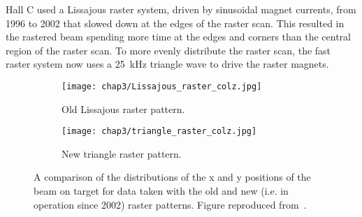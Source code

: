Hall C used a Lissajous raster system, driven by sinusoidal magnet currents,
from 1996 to 2002 that slowed down at the edges of the raster scan.
This resulted in the rastered beam spending more time at the edges and corners
than the central region of the raster scan.
To more evenly distribute the raster scan, the fast raster system now uses a
\SI{25}{\kilo\Hz} triangle wave to drive the raster magnets.

\begin{figure}[h]
    \centering
    \begin{subfigure}[b]{0.4\textwidth}
        \centering
        \texttt{[image: chap3/Lissajous\_raster\_colz.jpg]}
        \caption{Old Lissajous raster pattern.}
        \label{fig:Lissajous_raster}
    \end{subfigure}
    \hfill
    \begin{subfigure}[b]{0.4\textwidth}
        \centering
        \texttt{[image: chap3/triangle\_raster\_colz.jpg]}
        \caption{New triangle raster pattern.}
        \label{fig:triangle_raster}
    \end{subfigure}
    \caption[A comparison of the distributions of the x and y positions of the
             beam on target for data taken with the old and new raster patterns.]{A comparison of the distributions of the x and y positions of the
             beam on target for data taken with the old and new (i.e. in
             operation since 2002) raster patterns. Figure reproduced
             from~\cite{Yan_2005}.}
    \label{fig:raster_comparison}
\end{figure}

